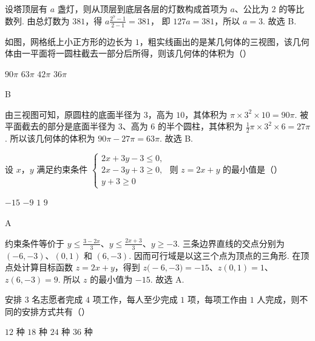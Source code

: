 \begin{solution}
设塔顶层有 \(a\) 盏灯，则从顶层到底层各层的灯数构成首项为 \(a\)、公比为 \(2\) 的等比数列. 由总灯数为 \(381\)，得
\(a\frac{2^7-1}{2-1}=381\)，
即 \(127a=381\)，所以 \(a=3\). 故选 B.
\end{solution}

\begin{problem}
如图，网格纸上小正方形的边长为 \(1\)，粗实线画出的是某几何体的三视图，该几何体由一平面将一圆柱截去一部分后所得，则该几何体的体积为（\quad）


\choices
    {\(90\pi\)}
    {\(63\pi\)}
    {\(42\pi\)}
    {\(36\pi\)}
\end{problem}

\begin{answer}
B
\end{answer}

\begin{solution}
由三视图可知，原圆柱的底面半径为 \(3\)，高为 \(10\)，其体积为 \(\pi\times3^2\times10=90\pi\). 被平面截去的部分是底面半径为 \(3\)、高为 \(6\) 的半个圆柱，其体积为
\(\frac12\pi\times3^2\times6=27\pi\).
所以该几何体的体积为 \(90\pi-27\pi=63\pi\). 故选 B.
\end{solution}

\begin{problem}
设 \(x\)，\(y\) 满足约束条件
\(\begin{cases}
2x+3y-3\le 0,\\
2x-3y+3\ge 0,\\
y+3\ge 0
\end{cases}\)
则 \(z=2x+y\) 的最小值是（\quad）

\choices
    {\(-15\)}
    {\(-9\)}
    {\(1\)}
    {\(9\)}
\end{problem}

\begin{answer}
A
\end{answer}

\begin{solution}
约束条件等价于
\(y\le\frac{3-2x}{3}\)、\(y\le\frac{2x+3}{3}\)、\(y\ge-3\).
三条边界直线的交点分别为 \((-6,-3)\)、\((0,1)\) 和 \((6,-3)\). 因而可行域是以这三个点为顶点的三角形. 在顶点处计算目标函数 \(z=2x+y\)，得到
\(z\bigl(-6,-3\bigr)=-15\)、\(z(0,1)=1\)、\(z(6,-3)=9\).
所以 \(z\) 的最小值为 \(-15\). 故选 A.
\end{solution}

\begin{problem}
安排 \(3\text{ 名}\)志愿者完成 \(4\text{ 项}\)工作，每人至少完成 \(1\text{ 项}\)，每项工作由 \(1\text{ 人}\)完成，则不同的安排方式共有（\quad）

\choices
    {\(12\text{ 种}\)}
    {\(18\text{ 种}\)}
    {\(24\text{ 种}\)}
    {\(36\text{ 种}\)}
\end{problem}

